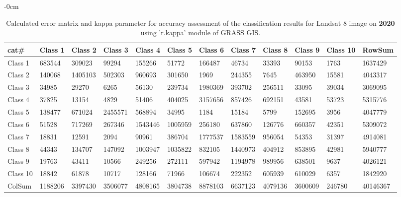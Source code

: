 \documentclass[sustainability,article,submit,pdftex,moreauthors]{Definitions/mdpi}
\begin{document}
\begin{table}[H] 
\footnotesize
    \centering
    \begin{adjustwidth}{-\extralength}{0cm}
    \caption{Calculated error matrix and kappa parameter for accuracy assessment of the classification results for Landsat 8 image on \textbf{2020} using 'r.kappa' module of GRASS GIS.\label{tab03}}
 	\begin{tabularx}{\fulllength}{|l|l|l|l|l|l|l|l|l|l|l|l|}
    \toprule
        \textbf{cat\#} & \textbf{Class 1} & \textbf{Class 2} & \textbf{Class 3} & \textbf{Class 4} & \textbf{Class 5} & \textbf{Class 6} & \textbf{Class 7} & \textbf{Class 8} & \textbf{Class 9} & \textbf{Class 10} & \textbf{RowSum} \\ \hline
        Class 1 & \cellcolor{green!20}683544 & 309023 & 99294 & 155266 & 51772 & 166487 & 46734 & 33393 & 90153 & 1763 & 1637429 \\ \hline
        Class 2 & 140068 & \cellcolor{green!20}1405103 & 502303 & 960693 & 301650 & 1969 & 244355 & 7645 & 463950 & 15581 & 4043317 \\ \hline
        Class 3 & 34985 & 29270 & \cellcolor{green!20}6265 & 56130 & 239734 & 1980369 & 393702 & 256511 & 33095 & 39034 & 3069095 \\ \hline
        Class 4 & 37825 & 13154 & 4829 & \cellcolor{green!20}51406 & 404025 & 3157656 & 857426 & 692151 & 43581 & 53723 & 5315776 \\ \hline
        Class 5 & 138477 & 671024 & 2455571 & 568894 & \cellcolor{green!20}34995 & 1184 & 15184 & 5799 & 152695 & 3956 & 4047779 \\ \hline
        Class 6 & 51528 & 717269 & 267346 & 1543446 & 1005959 & \cellcolor{green!20}256180 & 637860 & 126776 & 660357 & 42351 & 5309072 \\ \hline
        Class 7 & 18831 & 12591 & 2094 & 90961 & 386704 & 1777537 & \cellcolor{green!20}1583559 & 956054 & 54353 & 31397 & 4914081 \\ \hline
        Class 8 & 44343 & 134707 & 147092 & 1003947 & 1035822 & 832105 & 1440973 & \cellcolor{green!20}404912 & 853895 & 42981 & 5940777 \\ \hline
        Class 9 & 19763 & 43411 & 10566 & 249256 & 272111 & 597942 & 1194978 & 989956 & \cellcolor{green!20}638501 & 9637 & 4026121 \\ \hline
        Class 10 & 18842 & 61878 & 10717 & 128166 & 71966 & 106674 & 222352 & 605939 & 610029 & \cellcolor{green!20}6357 & 1842920 \\ \hline
        ColSum & 1188206 & 3397430 & 3506077 & 4808165 & 3804738 & 8878103 & 6637123 & 4079136 & 3600609 & 246780 & \cellcolor{green!20}40146367 \\ \hline

        \bottomrule
    \end{tabularx}
    \end{adjustwidth}
\end{table}
\end{document}
